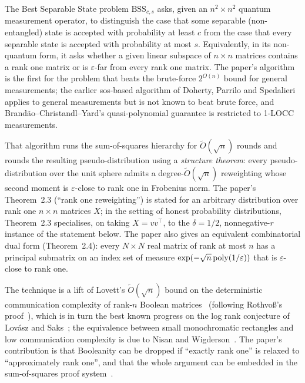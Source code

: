\documentclass{aicr-conjecture}
\newcommand{\Ot}{\tilde{O}}
\newcommand{\BSS}{\mathrm{BSS}}
\begin{document}
The Best Separable State problem $\BSS_{c,s}$ asks, given an $n^{2}
\times n^{2}$ quantum measurement operator, to distinguish the case
that some separable (non-entangled) state is accepted with probability
at least $c$ from the case that every separable state is accepted with
probability at most $s$. Equivalently, in its non-quantum form, it
asks whether a given linear subspace of $n \times n$ matrices contains
a rank one matrix or is $\varepsilon$-far from every rank one matrix.
The paper's algorithm is the first for the problem that beats the
brute-force $2^{O(n)}$ bound for general measurements; the earlier
sos-based algorithm of Doherty, Parrilo and Spedalieri applies to
general measurements but is not known to beat brute force, and
Brand\~{a}o--Christandl--Yard's quasi-polynomial guarantee is
restricted to 1-LOCC measurements.

That algorithm runs the sum-of-squares hierarchy for $\Ot(\sqrt{n})$
rounds and rounds the resulting pseudo-distribution using a
\emph{structure theorem}: every pseudo-distribution over the unit
sphere admits a degree-$\Ot(\sqrt{n})$ reweighting whose second moment
is $\varepsilon$-close to rank one in Frobenius norm. The paper's
Theorem~2.3 (``rank one reweighting'') is stated for an arbitrary
distribution over rank one $n \times n$ matrices $X$; in the setting
of honest probability distributions, Theorem~2.3 specialises, on
taking $X = vv^{\top}$, to the $\delta = 1/2$, nonnegative-$r$
instance of the statement below. The paper also gives an equivalent
combinatorial dual form (Theorem~2.4): every $N \times N$ real matrix
of rank at most $n$ has a principal submatrix on an index set of
measure $\exp(-\sqrt{n}\,\mathrm{poly}(1/\varepsilon))$ that is
$\varepsilon$-close to rank one.

The technique is a lift of Lovett's $\Ot(\sqrt{n})$ bound on the
deterministic communication complexity of rank-$n$ Boolean
matrices~\cite{Lov14} (following Rothvo{\ss}'s proof~\cite{Rot14}),
which is in turn the best known progress on the log rank conjecture of
Lov\'{a}sz and Saks~\cite{LS88}; the equivalence between small
monochromatic rectangles and low communication complexity is due to
Nisan and Wigderson~\cite{NW94}. The paper's contribution is that
Booleanity can be dropped if ``exactly rank one'' is relaxed to
``approximately rank one'', and that the whole argument can be
embedded in the sum-of-squares proof system~\cite{BKS16}.
\end{document}
